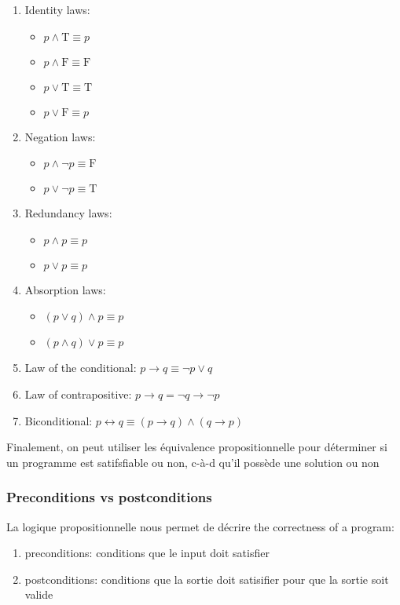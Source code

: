 \documentclass{article}
\begin{document}
\begin{proposition}
\begin{enumerate}
	\item Identity laws:
	    \begin{itemize}
		\item $p \wedge \mathrm{T} \equiv p $
		\item $ p \wedge \mathrm{F} \equiv \mathrm{F} $
		\item $p \vee \mathrm{T} \equiv \mathrm{T} \quad$
		\item $p \vee \mathrm{F} \equiv p$
	    \end{itemize}
	\item Negation laws:
	    \begin{itemize}
		\item $ p \wedge \neg p \equiv \mathrm{F} $
		\item $ p \vee \neg p \equiv \mathrm{T}$
	    \end{itemize}
	\item Redundancy laws:
	    \begin{itemize}
		\item $p \wedge p \equiv p$
		\item $ p \vee p \equiv p$
	    \end{itemize}
	\item Absorption laws:
	    \begin{itemize}
		\item $(p \vee q) \wedge p \equiv p $
		\item $(p \wedge q) \vee p \equiv p$
	    \end{itemize}
	\item Law of the conditional:  $p \rightarrow q \equiv \neg p \vee q$
	\item Law of contrapositive: $p \rightarrow q=\neg q \rightarrow \neg p$
	\item Biconditional: $p \leftrightarrow q \equiv(p \rightarrow q) \wedge(q \rightarrow p)$
    \end{enumerate}
\end{proposition}

Finalement, on peut utiliser les équivalence propositionnelle pour
déterminer si un programme est satifsfiable ou non, c-à-d qu'il possède une
solution ou non

\subsubsection{Preconditions vs postconditions}
    La logique propositionnelle nous permet de décrire the correctness of
    a program:
    \begin{enumerate}
        \item preconditions: conditions que le input doit satisfier
	\item postconditions: conditions que la sortie doit satisifier
	    pour que la sortie soit valide
    \end{enumerate}
\end{document}
